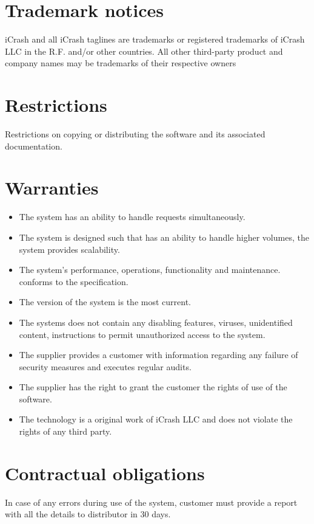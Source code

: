 \section{Trademark notices}
iCrash and all iCrash taglines are trademarks or registered trademarks of iCrash LLC in the R.F. and/or other countries. All other third-party product and company names may be trademarks of their respective owners


\section{Restrictions}
Restrictions on copying or distributing the software and its associated
documentation.

\section{Warranties}
\begin{itemize}
  \item The system has an ability to handle requests simultaneously.
  \item The system is designed such that has an ability to handle higher
  volumes, the system provides scalability.
  \item The system's performance, operations, functionality and maintenance.
  conforms to the specification.
  \item The version of the system is the most current.
  \item The systems does not contain any disabling features, viruses,
  unidentified content, instructions to permit unauthorized access to the system.
  \item The supplier provides a customer with information regarding any failure
  of security measures and executes regular audits.
  \item The supplier has the right to grant the customer the rights of use of
  the software.
  \item The technology is a original work of iCrash LLC and does not violate the
  rights of any third party.
\end{itemize}

\section{Contractual obligations}
In case of any errors during use of the system, customer must provide a report with all the details to distributor in 30 days. 

